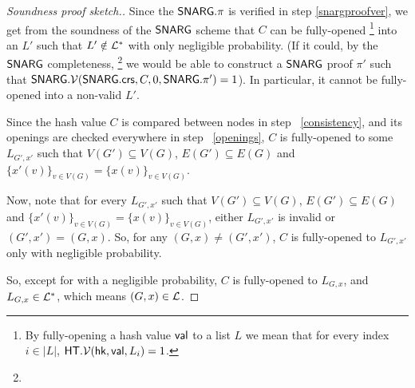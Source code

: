 \begin{proof}[Soundness proof sketch.]
    Since the $\mathsf{SNARG}.\pi$ is verified in step    \ref{snargproofver}, we get from the soundness of the $\mathsf{SNARG}$ scheme that $C$ can be fully-opened
    \footnote{
    By fully-opening a hash value $\mathsf{val}$ to a list $L$ we mean that for every index $i\in |L|$,  $\mathsf{HT}.\mathcal{V}(\mathsf{hk}, \mathsf{val}, L_i) = 1$.
    }
    into an $L'$ such that $L'\notin \mathcal{L}^*$ with only negligible probability. (If it could, by the $\mathsf{SNARG}$ completeness, \footnote{
    }
    we would be able to construct a $\mathsf{SNARG}$ proof $\pi'$ such that $\mathsf{SNARG}.\mathcal{V}(\mathsf{SNARG}.\mathsf{crs}, C, 0, \mathsf{SNARG}.\pi') = 1$). 
    In particular, it cannot be fully-opened into a non-valid $L'$. 
    
    Since the hash value $C$ is compared between nodes in step ~\ref{consistency}, and its openings are checked everywhere in step ~\ref{openings},
    $C$ is fully-opened to some $L_{G',x'}$ such that $V(G')\subseteq V(G)$,  $E(G')\subseteq E(G)$ and $\{x'(v)\}_{v\in V(G)} = \{x(v)\}_{v\in V(G)}$. %
    
    Now, note that for every $L_{G',x'}$ such that $V(G')\subseteq V(G)$,  $E(G')\subseteq E(G)$ and $\{x'(v)\}_{v\in V(G)} = \{x(v)\}_{v\in V(G)}$, either $L_{G',x'}$ is invalid or $(G',x') = (G,x)$. So, for any $(G,x)\neq (G',x')$, $C$ is fully-opened to $L_{G',x'}$ only with negligible probability.
    
    So, except for with a negligible probability, $C$ is fully-opened to $L_{G,x}$, and $L_{G,x}\in\mathcal{L}^*$, which means $(G,x)\in\mathcal{L}$.
\end{proof}
